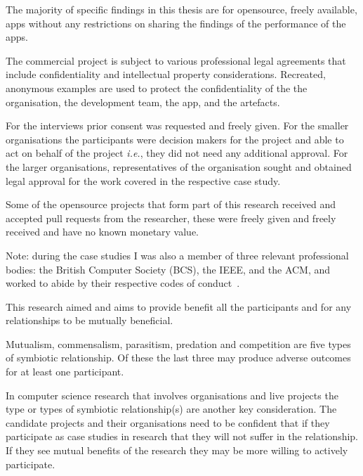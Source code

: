 The majority of specific findings in this thesis are for opensource, freely available, apps without any restrictions on sharing the findings of the performance of the apps. 

The commercial project is subject to various professional legal agreements that include confidentiality and intellectual property considerations. Recreated, anonymous examples are used to protect the confidentiality of the the organisation, the development team, the app, and the artefacts.

For the interviews prior consent was requested and freely given. For the smaller organisations the participants were decision makers for the project and able to act on behalf of the project \textit{i.e.}, they did not need any additional approval. For the larger organisations, representatives of the organisation sought and obtained legal approval for the work covered in the respective case study.

Some of the opensource projects that form part of this research received and accepted pull requests from the researcher, these were freely given and freely received and have no known monetary value.

Note: during the case studies I was also a member of three relevant professional bodies: the British Computer Society (BCS), the IEEE, and the ACM, and worked to abide by their respective codes of conduct~\citep{bcs_code_of_conduct_2021, ieee_and_acm_code_1999on}.


This research aimed and aims to provide benefit all the participants and for any relationships to be mutually beneficial.

Mutualism, commensalism, parasitism, predation and competition are five types of symbiotic relationship. %
Of these the last three may produce adverse outcomes for at least one participant.

In computer science research that involves organisations and live projects the type or types of symbiotic relationship(s) are another key consideration. The candidate projects and their organisations need to be confident that if they participate as case studies in research that they will not suffer in the relationship. If they see mutual benefits of the research they may be more willing to actively participate. 




